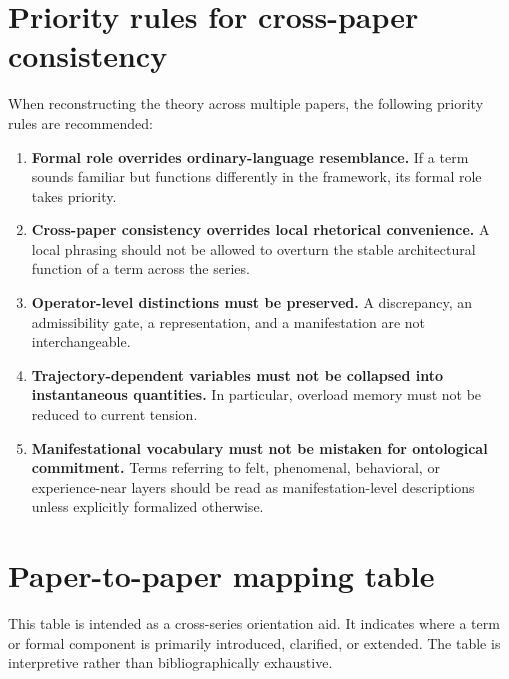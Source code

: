 \documentclass[11pt,a4paper]{article}
\begin{document}
	\section{Priority rules for cross-paper consistency}
	
	When reconstructing the theory across multiple papers, the following priority rules are recommended:
	\begin{enumerate}[leftmargin=2em]
		\item \textbf{Formal role overrides ordinary-language resemblance.} If a term sounds familiar but functions differently in the framework, its formal role takes priority.
		\item \textbf{Cross-paper consistency overrides local rhetorical convenience.} A local phrasing should not be allowed to overturn the stable architectural function of a term across the series.
		\item \textbf{Operator-level distinctions must be preserved.} A discrepancy, an admissibility gate, a representation, and a manifestation are not interchangeable.
		\item \textbf{Trajectory-dependent variables must not be collapsed into instantaneous quantities.} In particular, overload memory must not be reduced to current tension.
		\item \textbf{Manifestational vocabulary must not be mistaken for ontological commitment.} Terms referring to felt, phenomenal, behavioral, or experience-near layers should be read as manifestation-level descriptions unless explicitly formalized otherwise.
	\end{enumerate}
	
	\section{Paper-to-paper mapping table}
	
	This table is intended as a cross-series orientation aid. It indicates where a term or formal component is primarily introduced, clarified, or extended. The table is interpretive rather than bibliographically exhaustive.
	
\end{document}
